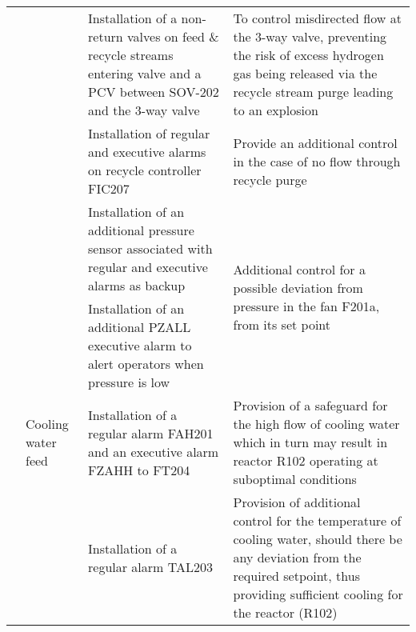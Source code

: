 {\begin{tabular}{@{}l>{\raggedright}p{2cm}p{7cm}p{10cm}@{}}
    &                           & Installation of a non-return valves on feed \& recycle streams entering valve and a PCV between SOV-202 and the 3-way valve                                   & To control misdirected flow at the 3-way valve, preventing the risk of excess hydrogen gas being released via the recycle stream purge leading to an explosion                                               \\ \cmidrule(l){3-4} 
    &                           & Installation of regular and executive alarms on  recycle controller FIC207                                                                                    & Provide an additional control in the case of no flow through recycle purge                                                                                                                                   \\ \cmidrule(l){3-4} 
    &                           & Installation of an additional pressure sensor associated with regular and executive alarms as backup                                                          & \multirow[t]{2}{=}{Additional control for a possible deviation from pressure in the fan F201a, from its set point}                                                                                           \\ \cmidrule(lr){3-3}
    &                           & Installation of an additional PZALL executive alarm to alert operators when pressure is low                                                                   &                                                                                                                                                                                                              \\ \cmidrule(l){2-4} 
    & Cooling water feed        & Installation of a regular alarm FAH201 and an executive alarm FZAHH to FT204                                                                                  & Provision of a safeguard for the high flow of cooling water which in turn may result in reactor R102 operating at suboptimal conditions                                                                      \\ \cmidrule(l){3-4} 
    &                           & Installation of a regular alarm TAL203                                                                                                                        & \multirow[t]{3}{=}{Provision of additional control for the temperature of cooling water, should there be any deviation from the required setpoint, thus providing sufficient cooling for the reactor (R102)} \\ \cmidrule(lr){3-3}

\end{tabular}}
